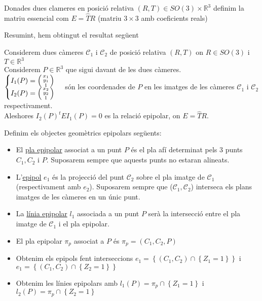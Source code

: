 \documentclass[a4paper,12pt]{article}
\begin{document}
	\begin{definicio}
		Donades dues clameres en posició relativa $(R, T) \in SO(3)\times\mathbb{R}^3$ definim la matriu essencial com $E = \hat{T}R$ (matriu $3\times3$ amb coeficients reals)
	\end{definicio}
	Resumint, hem obtingut el resultat següent
	\begin{teorema}
		Considerem dues càmeres $\mathcal{C}_1$ i $\mathcal{C}_2$ de posició relativa $(R,T)$ on $R \in SO(3)$ i $T \in \mathbb{R}^3$\\
		Considerem $P \in \mathbb{R}^3$ que sigui davant de les dues càmeres.\\
		$\begin{cases}I_1(P) = \begin{psmallmatrix}x_1\\y_1\\1\end{psmallmatrix}\\I_2(P) = \begin{psmallmatrix}x_2\\y_2\\1\end{psmallmatrix}\end{cases}$ són les coordenades de $P$ en les imatges de les càmeres $\mathcal{C}_1$ i $\mathcal{C}_2$ respectivament.\\
		Aleshores $I_2(P)^tEI_1(P) = 0$ es la relació epipolar, on $E = \hat{T}R$.
	\end{teorema}
	\begin{definicio}
		Definim els objectes geomètrics epipolars següents:
		\begin{itemize}
			\item El \underline{pla epipolar} associat a un punt $P$ és el pla afí determinat pels $3$ punts $C_1, C_2$ i $P$. Suposarem sempre que aquests punts no estaran alineats.
			\item L'\underline{epipol} $e_1$ és la projecció del punt $\mathcal{C}_2$ sobre el pla imatge de $\mathcal{C}_1$ (respectivament amb $e_2$). Suposarem sempre que ($\mathcal{C}_1, \mathcal{C}_2$) interseca els plans imatges de les càmeres en un únic punt.
			\item La \underline{línia epipolar} $l_1$ associada a un punt $P$ serà la intersecció entre el pla imatge de $\mathcal{C}_1$ i el pla epipolar.
		\end{itemize}
	\end{definicio}
	\begin{obs}
		\begin{itemize}
			\item El pla epipolar $\pi_p$ associat a $P$ és $\pi_p = (C_1, C_2, P)$
			\item Obtenim els epipols fent interseccions $e_1 = \left\{(C_1, C_2) \cap \left\{Z_1 = 1\right\}\right\}$ i $e_1 = \left\{(C_1, C_2) \cap \left\{Z_2 = 1\right\}\right\}$
			\item Obtenim les línies epipolars amb $l_1(P) = \pi_p \cap \left\{Z_1 = 1\right\}$ i $l_2(P) = \pi_p \cap \left\{Z_2 = 1\right\}$
		\end{itemize}
	\end{obs}
\end{document}
